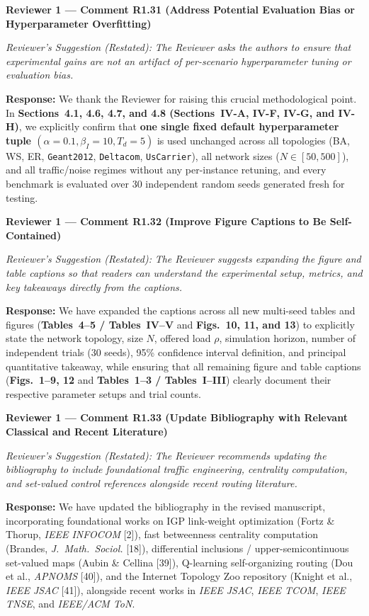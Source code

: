 \documentclass[11pt,a4paper]{article}
\newcommand{\cbox}[2]{%
  \vspace{0.6em}\noindent\textbf{#1}\par\smallskip
  \noindent\textit{Reviewer's Suggestion (Restated):} \textit{#2}\par\smallskip
}
\begin{document}
\hrulefill

\cbox{Reviewer 1 --- Comment R1.31 (Address Potential Evaluation Bias or Hyperparameter Overfitting)}{The Reviewer asks the authors to ensure that experimental gains are not an artifact of per-scenario hyperparameter tuning or evaluation bias.}

\noindent\textbf{Response:} We thank the Reviewer for raising this crucial methodological point. In \textbf{Sections~4.1, 4.6, 4.7, and 4.8 (Sections~IV-A, IV-F, IV-G, and IV-H)}, we explicitly confirm that \textbf{one single fixed default hyperparameter tuple $(\alpha = 0.1, \beta_I = 10, T_d = 5)$} is used unchanged across all topologies (BA, WS, ER, \texttt{Geant2012}, \texttt{Deltacom}, \texttt{UsCarrier}), all network sizes ($N \in [50, 500]$), and all traffic/noise regimes without any per-instance retuning, and every benchmark is evaluated over 30 independent random seeds generated fresh for testing.

\hrulefill

\cbox{Reviewer 1 --- Comment R1.32 (Improve Figure Captions to Be Self-Contained)}{The Reviewer suggests expanding the figure and table captions so that readers can understand the experimental setup, metrics, and key takeaways directly from the captions.}

\noindent\textbf{Response:} We have expanded the captions across all new multi-seed tables and figures (\textbf{Tables~4--5 / Tables~IV--V} and \textbf{Figs.~10, 11, and 13}) to explicitly state the network topology, size $N$, offered load $\rho$, simulation horizon, number of independent trials (30 seeds), 95\% confidence interval definition, and principal quantitative takeaway, while ensuring that all remaining figure and table captions (\textbf{Figs.~1--9, 12} and \textbf{Tables~1--3 / Tables~I--III}) clearly document their respective parameter setups and trial counts.

\hrulefill

\cbox{Reviewer 1 --- Comment R1.33 (Update Bibliography with Relevant Classical and Recent Literature)}{The Reviewer recommends updating the bibliography to include foundational traffic engineering, centrality computation, and set-valued control references alongside recent routing literature.}

\noindent\textbf{Response:} We have updated the bibliography in the revised manuscript, incorporating foundational works on IGP link-weight optimization (Fortz \& Thorup, \textit{IEEE INFOCOM} [2]), fast betweenness centrality computation (Brandes, \textit{J.\ Math.\ Sociol.} [18]), differential inclusions / upper-semicontinuous set-valued maps (Aubin \& Cellina [39]), Q-learning self-organizing routing (Dou et al., \textit{APNOMS} [40]), and the Internet Topology Zoo repository (Knight et al., \textit{IEEE JSAC} [41]), alongside recent works in \textit{IEEE JSAC}, \textit{IEEE TCOM}, \textit{IEEE TNSE}, and \textit{IEEE/ACM ToN}.
\end{document}

